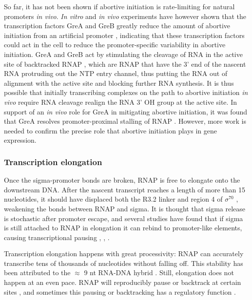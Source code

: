 So far, it has not been shown if abortive initiation is rate-limiting for
natural promoters \textit{in vivo}. \textit{In vitro} and \textit{in vivo}
experiments have however shown that the transcription factors GreA and GreB
greatly reduce the amount of abortive initiation from an artificial promoter
\cite{hsu_escherichia_1995}, indicating that these transcription factors could
act in the cell to reduce the promoter-specific variability in abortive
initiation. GreA and GreB act by stimulating the cleavage of RNA in the active
site of backtracked RNAP \cite{toulme_grea_2000}, which are RNAP that have the
3' end of the nascent RNA protruding out the NTP entry channel, thus putting
the RNA out of alignment with the active site and blocking further RNA
synthesis. It is thus possible that initially transcribing complexes on the
path to abortive initiation \textit{in vivo} require RNA cleavage realign the
RNA 3' OH group at the active site. In support of an \textit{in vivo} role for
GreA in mitigating abortive initiation, it was found that GreA resolves
promoter-proximal stalling of RNAP \cite{kusuya_transcription_2011}. However,
more work is needed to confirm the precise role that abortive initiation plays
in gene expression.

\subsubsection{Transcription elongation}
Once the sigma-promoter bonds are broken, RNAP is free to elongate onto the
downstream DNA. After the nascent transcript reaches a length of more than 15
nucleotides, it should have displaced both the R3.2 linker and region 4 of
$\sigma^{70}$ \cite{mekler_structural_2002} \cite{nickels_interaction_2005},
weakening the bonds between RNAP and sigma. It is thought that sigma release is
stochastic after promoter escape, and several studies have found that if sigma
is still attached to RNAP in elongation it can rebind to promoter-like
elements, causing transcriptional pausing \cite{ring_function_1996},
\cite{kapanidis_retention_2005}, \cite{raffaelle_holoenzyme_2005}.

Transcription elongation happens with great processivity: RNAP can accurately
transcribe tens of thousands of nucleotides without falling off. This stability
has been attributed to the $\approx$ 9 nt RNA-DNA hybrid
\cite{nudler_rna-dna_1997}. Still, elongation does not happen at an even pace.
RNAP will reproducibly pause or backtrack at certain sites
\cite{herbert_sequence-resolved_2006} , and sometimes this pausing or
backtracking has a regulatory function \cite{landick_r_regulatory_2006}.

